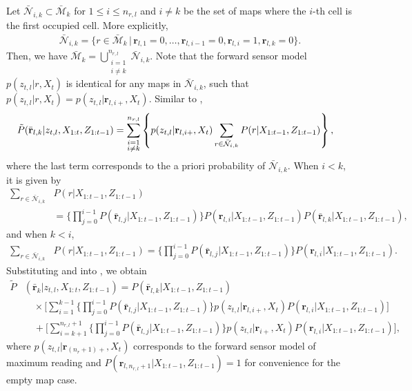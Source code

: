Let $\bar{\mathcal{N}}_{i,k}\subset \bar{\mathcal{M}}_k $ for $1\leq i\leq n_{r,l}$ and $i\neq k$ be the set of maps where the $i$-th cell is the first occupied cell. More explicitly, 
\begin{align*}
\bar{\mathcal{N}}_{i,k}=\{r\in\bar{\mathcal{M}}_k\,|\, \mathbf{r}_{l,1}=0,\ldots,\mathbf{r}_{l,i-1}=0,
\mathbf{r}_{l,i}=1,\mathbf{r}_{l,k}=0\}.
\end{align*}
Then, we have $\bar{\mathcal{M}}_k=\bigcup_{\substack{i=1\\i\neq k}}^{n_{r,l}} \bar{\mathcal{N}}_{i,k}$. Note that the forward sensor model $p(z_{t,l}|r,X_t)$ is identical for any maps in $\bar{\mathcal{N}}_{i,k}$, such that $p(z_{t,l}|r,X_t)=p(z_{t,l}|\mathbf{r}_{l,i+},X_t)$. Similar to ,
\begin{align}
\tilde P&(\bar{\mathbf{r}}_{l,k}|z_{t,l},X_{1:t},Z_{1:t-1})= \sum_{\substack{i=1\\i\neq k}}^{n_{r,l}} \left\{ p(z_{t,l}|\mathbf{r}_{l,i+},X_t) \sum_{r\in\bar{\mathcal{N}}_{i,k}} P(r|X_{1:t-1},Z_{1:t-1}) \right\},\label{eqn:tildePbarlk0}
\end{align}
where the last term corresponds to the a priori probability of $\bar{\mathcal{N}}_{i,k}$. When $i<k$, it is given by
\begin{align}
\sum_{r\in\bar{\mathcal{N}}_{i,k}} & P(r|X_{1:t-1},Z_{1:t-1}) \nonumber\\&= \bigg\{\prod_{j=0}^{i-1}P(\bar{\mathbf{r}}_{l,j}|X_{1:t-1},Z_{1:t-1})\bigg\} P({\mathbf{r}}_{l,i}|X_{1:t-1},Z_{1:t-1})P(\bar{\mathbf{r}}_{l,k}|X_{1:t-1},Z_{1:t-1}),\label{eqn:PbarNik1}
\end{align}
and when $k<i$,
\begin{align}
\sum_{r\in\bar{\mathcal{N}}_{i,k}} & P(r|X_{1:t-1},Z_{1:t-1}) = \bigg\{\prod_{j=0}^{i-1}P(\bar{\mathbf{r}}_{l,j}|X_{1:t-1},Z_{1:t-1})\bigg\}
P({\mathbf{r}}_{l,i}|X_{1:t-1},Z_{1:t-1}).\label{eqn:PbarNik2}
\end{align}
Substituting  and  into , we obtain
\begin{align}
\tilde P &(\bar{\mathbf{r}}_k|z_{t,l},X_{1:t},Z_{1:t-1})
=P(\bar{\mathbf{r}}_{l,k}|X_{1:t-1},Z_{1:t-1})\nonumber\\
&\quad\times \bigg[\sum_{i=1}^{k-1}\bigg\{\prod_{j=0}^{i-1}P(\bar{\mathbf{r}}_{l,j}|X_{1:t-1},Z_{1:t-1})\bigg\} p(z_{t,l}|\mathbf{r}_{l,i+},X_t)P(\mathbf{r}_{l,i}|X_{1:t-1},Z_{1:t-1})\bigg]
\nonumber
\\
&\quad
+
\bigg[\sum_{i=k+1}^{n_{r,l}+1}\bigg\{\prod_{j=0}^{i-1}P(\bar{\mathbf{r}}_{l,j}|X_{1:t-1},Z_{1:t-1})\bigg\} p(z_{t,l}|\mathbf{r}_{i+},X_t)P(\mathbf{r}_{l,i}|X_{1:t-1},Z_{1:t-1})\bigg],\label{eqn:tildePbar}
\end{align}
where $p(z_{t,l}|\mathbf{r}_{(n_r+1)+},X_t)$ corresponds to the forward sensor model of maximum reading and $P(\mathbf{r}_{l,n_{r,l}+1}|X_{1:t-1},Z_{1:t-1})=1$ for convenience for the empty map case.


